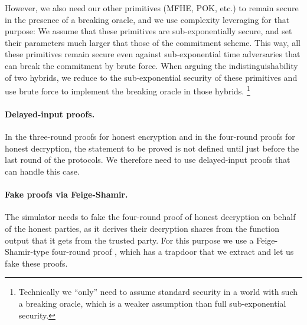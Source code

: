 However, we also need our other primitives (MFHE, POK, etc.) to remain secure in the presence of a breaking oracle, and we use complexity leveraging for that purpose: We assume that these primitives are sub-exponentially secure, and set their parameters much larger that those of the commitment scheme. This way, all these primitives remain secure even against sub-exponential time adversaries that can break the commitment by brute force. When arguing the indistinguishability of two hybrids, we reduce to the sub-exponential security of these primitives and use brute force to implement the breaking oracle in those hybrids.%
\footnote{Technically we ``only'' need to assume standard security in a world with such a breaking oracle, which is a weaker assumption than full sub-exponential security.}

\paragraph{Delayed-input proofs.}
In the three-round proofs for honest encryption and in the four-round proofs for honest decryption, the statement to be proved is not defined until just before the last round of the protocols. We therefore need to use delayed-input proofs that can handle this case.


\paragraph{Fake proofs via Feige-Shamir.}
The simulator needs to fake the four-round proof of honest decryption on behalf of the honest parties, as it derives their decryption shares from the function output that it gets from the trusted party. For this purpose we use a Feige-Shamir-type four-round proof  \cite{STOC:FeiSha90}, which has a trapdoor that we extract and let us fake these proofs.


